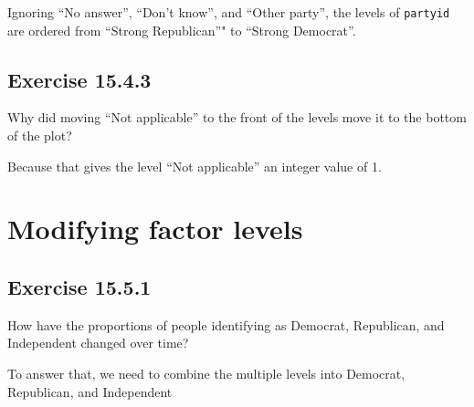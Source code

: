 \documentclass[]{book}
\newenvironment{Shaded}{\begin{snugshade}}{\end{snugshade}}
\newcommand{\CommentTok}[1]{\textcolor[rgb]{0.56,0.35,0.01}{\textit{#1}}}
\newcommand{\KeywordTok}[1]{\textcolor[rgb]{0.13,0.29,0.53}{\textbf{#1}}}
\newcommand{\NormalTok}[1]{#1}
\newcommand{\OperatorTok}[1]{\textcolor[rgb]{0.81,0.36,0.00}{\textbf{#1}}}
\theoremstyle{plain}
\theoremstyle{remark}
\theoremstyle{definition}
\theoremstyle{definition}
\theoremstyle{definition}
\theoremstyle{remark}
\begin{document}
Ignoring ``No answer'', ``Don't know'', and ``Other party'', the levels
of \texttt{partyid} are ordered from ``Strong Republican''" to ``Strong
Democrat''.

\begin{Shaded}
\end{Shaded}

\hypertarget{exercise-15.4.3}{%
\subsection*{\texorpdfstring{Exercise
{15.4.3}}{Exercise 15.4.3}}\label{exercise-15.4.3}}

Why did moving ``Not applicable'' to the front of the levels move it to
the bottom of the plot?

Because that gives the level ``Not applicable'' an integer value of 1.

\hypertarget{modifying-factor-levels}{%
\section{Modifying factor levels}\label{modifying-factor-levels}}

\hypertarget{exercise-15.5.1}{%
\subsection*{\texorpdfstring{Exercise
{15.5.1}}{Exercise 15.5.1}}\label{exercise-15.5.1}}

How have the proportions of people identifying as Democrat, Republican,
and Independent changed over time?

To answer that, we need to combine the multiple levels into Democrat,
Republican, and Independent

\begin{Shaded}
\end{Shaded}
\end{document}
